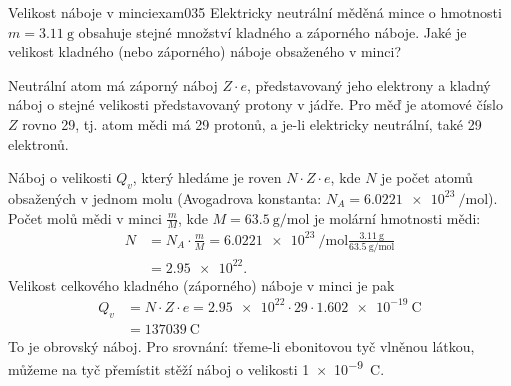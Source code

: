 \begin{fyzexam}{Velikost náboje v minci}{exam035}
  Elektricky neutrální měděná mince o hmotnosti \(m = \qty{3.11}{\g}\) obsahuje stejné množství
  kladného a záporného náboje. Jaké je velikost kladného (nebo záporného) náboje obsaženého v
  minci?

  Neutrální atom má záporný náboj \(Z\cdot e\), představovaný jeho elektrony a kladný náboj o stejné
  velikosti představovaný protony v jádře. Pro měď je atomové číslo \(Z\) rovno \num{29}, tj. atom
  mědi má \num{29} protonů, a je-li elektricky neutrální, také \num{29} elektronů.
  
  Náboj o velikosti \(Q_v\), který hledáme je roven \(N\cdot Z\cdot e\), kde \(N\) je počet atomů
  obsažených v  jednom molu (Avogadrova konstanta: \(N_A = \qty{6.0221e23}{\per\mole}\)). Počet molů
  mědi v minci \(\frac{m}{M}\), kde \(M = \qty{63.5}{\g\per\mole}\) je molární hmotnosti mědi:    
  \begin{align*}
    N &=N_A\cdot\frac{m}{M}
       =\qty{6.0221e23}{\per\mole}\frac{\qty{3.11}{\g}}{\qty{63.5}{\g\per\mole}}    \\ 
      &=\num{2.95e22}.
  \end{align*}
  Velikost celkového kladného (záporného) náboje v minci je pak 
  \begin{align*}
    Q_v &= N\cdot Z\cdot e = \num{2.95e22}\cdot\num{29}\cdot\qty{1.602e-19}{\coulomb}    \\
        &= \qty{137039}{\coulomb}
  \end{align*}
  To je obrovský náboj. Pro srovnání: třeme-li ebonitovou tyč vlněnou látkou, můžeme na tyč
  přemístit stěží náboj o velikosti \qty{1e-9}{\coulomb}.
\end{fyzexam}
